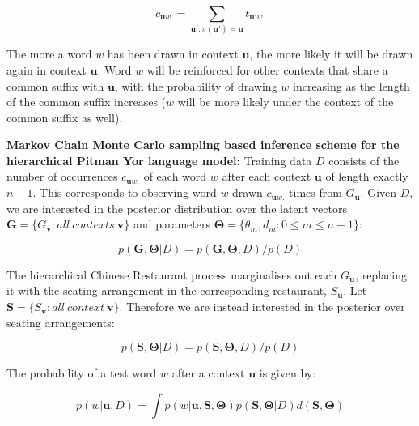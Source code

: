 \begin{equation}
c_{\boldsymbol{u}w.}=\sum _{\boldsymbol{u}':\pi (\boldsymbol{u}')=\boldsymbol{u}}t_{\boldsymbol{u}'w.}
\label{eq:hierarchicalChineseRestaurantC}
\end{equation}

The more a word $w$ has been drawn in context $\boldsymbol{u}$, the more likely it will be drawn again in context $\boldsymbol{u}$. Word $w$ will be reinforced for other contexts that share a common suffix with $\boldsymbol{u}$, with the probability of drawing $w$ increasing as the length of the common suffix increases ($w$ will be more likely under the context of the common suffix as well).

\textbf{Markov Chain Monte Carlo sampling based inference scheme for the hierarchical Pitman Yor language model:} Training data $D$ consists of the number of occurrences $c_{\boldsymbol{u}w.}$ of each word $w$ after each context $\boldsymbol{u}$ of length exactly $n-1$. This corresponds to observing word $w$ drawn $c_{\boldsymbol{u}w.}$ times from $G_{\boldsymbol{u}}$. Given $D$, we are interested in the posterior distribution over the latent vectors $\boldsymbol{G}=\{ G_{\boldsymbol{v}}\colon all\ contexts\ \boldsymbol{v} \} $ and parameters $\boldsymbol\Theta =\{ \theta_{m}, d_{m} \colon 0 \leq m \leq n-1 \}$:

\begin{equation}
p(\boldsymbol{G}, \boldsymbol\Theta | D)=p(\boldsymbol{G}, \boldsymbol\Theta, D)/p(D)
\label{eq:mcmcPosteriorG}
\end{equation}

The hierarchical Chinese Restaurant process marginalises out each $G_{\boldsymbol{u}}$, replacing it with the seating arrangement in the corresponding restaurant, $S_{\boldsymbol{u}}$. Let $\boldsymbol{S}=\{S_{\boldsymbol{v}}:all\ context\ \boldsymbol{v}\}$. Therefore we are instead interested in the posterior over seating arrangements:

\begin{equation}
p(\boldsymbol{S}, \boldsymbol\Theta |D)=p(\boldsymbol{S}, \boldsymbol\Theta, D)/p(D)
\label{eq:mcmcPosteriorS}
\end{equation}

The probability of a test word $w$ after a context $\boldsymbol{u}$ is given by:

\begin{equation}
p(w | \boldsymbol{u}, D)=\int p(w | \boldsymbol{u}, \boldsymbol{S}, \boldsymbol\Theta)p(\boldsymbol{S}, \boldsymbol\Theta | D)d(\boldsymbol{S}, \boldsymbol\Theta)
\label{eq:mcmcWordProb}
\end{equation}


